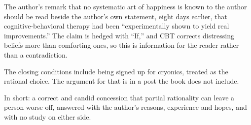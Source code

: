 \begin{afterword}
The author's remark that no systematic art of happiness is known to the author should be read beside the author's own statement, eight days earlier, that cognitive-behavioral therapy had been ``experimentally shown to yield real improvements.'' The claim is hedged with ``If,'' and CBT corrects distressing beliefs more than comforting ones, so this is information for the reader rather than a contradiction.

The closing conditions include being signed up for cryonics, treated as the rational choice. The argument for that is in a post the book does not include.

In short: a correct and candid concession that partial rationality can leave a person worse off, answered with the author's reasons, experience and hopes, and with no study on either side.
\end{afterword}

